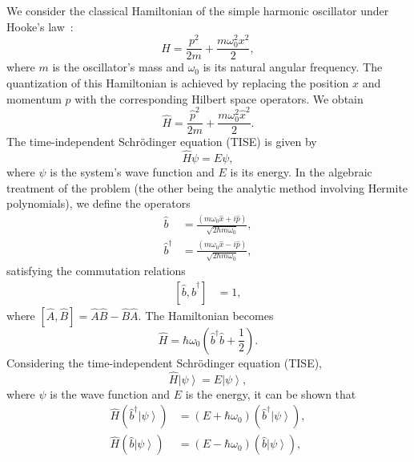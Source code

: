 \documentclass[onecolumn, 12pt, sort&compress]{elsarticle}
\newcommand{\ket}[1]{\left|{#1}\right\rangle}
\newcommand{\comm}[2]{\left[{#1},{#2}\right]}
\newcommand{\bop}{\hat{b}}
\newcommand{\bdag}{\bop^\dagger}
\begin{document}
We consider the classical Hamiltonian of the simple harmonic oscillator under Hooke's law~\cite{griffiths_introduction_2018}:
\begin{equation}
    H = \frac{p^2}{2m} + \frac{m\omega_0^2x^2}{2},
\end{equation}
where $m$ is the oscillator's mass and $\omega_0$ is its natural angular frequency. The quantization of this Hamiltonian is achieved by replacing the position $x$ and momentum $p$ with the corresponding Hilbert space operators. We obtain
\begin{equation}\label{eq:SHO_Ham}
    \hat{H} = \frac{\hat{p}^2}{2m} + \frac{m\omega_0^2\hat{x}^2}{2}.
\end{equation}
The time-independent Schr\"{o}dinger equation (TISE) is given by
\begin{equation}
    \hat{H}\psi = E\psi,
\end{equation}
where $\psi$ is the system's wave function and $E$ is its energy.  In the algebraic treatment of the problem (the other being the analytic method involving Hermite polynomials), we define the operators
\begin{subequations}
\begin{align}
    \bop &= \frac{\left(m\omega_0 \hat{x}+i\hat{p}\right)}{\sqrt{2\hbar m\omega_0}},
    \\
    \bdag &= \frac{\left(m\omega_0 \hat{x}-i\hat{p}\right)}{\sqrt{2\hbar m\omega_0}},
\end{align}
\end{subequations}
satisfying the commutation relations
\begin{align}
    \comm{\bop}{\bdag}&=1,
\end{align}
where $\comm{\hat{A}}{\hat{B}}=\hat{A}\hat{B}-\hat{B}\hat{A}$.  The Hamiltonian becomes
\begin{equation}
    \hat{H} = \hbar\omega_0\left(\bdag\bop+\frac{1}{2}\right).
\end{equation}
Considering the time-independent Schr\"{o}dinger equation (TISE),
\begin{equation}
    \hat{H}\ket{\psi} = E\ket{\psi},
\end{equation}
where $\psi$ is the wave function and $E$ is the energy, it can be shown that 
\begin{subequations}
    \begin{align}
        \hat{H}\left(\bdag\ket{\psi}\right) &= \left(E+\hbar\omega_0\right)\left(\bdag\ket{\psi}\right),
        \\
        \hat{H}\left(\bop\ket{\psi}\right) &= \left(E-\hbar\omega_0\right)\left(\bop\ket{\psi}\right),
    \end{align}
\end{subequations}
\end{document}
